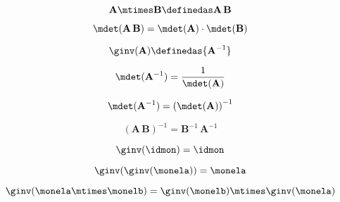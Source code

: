 \begin{equation} \label{eq:group-fullrank-composition}
   \mathbf{A} \mtimes \mathbf{B}  \definedas \mathbf{A}\,\mathbf{B}
\end{equation}


\begin{equation} \label{eq:group-fullrank-composition-det}
   \mdet(\mathbf{A} \, \mathbf{B}) = \mdet(\mathbf{A}) \cdot  \mdet(\mathbf{B})
\end{equation}

\begin{equation} \label{eq:group-fullrank-inverse}
   \ginv(\mathbf{A}) \definedas {\mathbf{A}^{-1}}
\end{equation}


\begin{equation} \label{eq:group-fullrank-inverse-det}
   \mdet(\mathbf{A}^{-1}) = \frac{1}{\mdet(\mathbf{A})}
\end{equation}

\begin{equation} \label{eq:group-fullrank-inverse-det2}
   \mdet(\mathbf{A}^{-1}) = \left( \mdet(\mathbf{A}) \right) ^ {-1}
\end{equation}

\begin{equation} \label{eq:group-fullrank-inverse-comp}
   (\mathbf{A}\,\mathbf{B})^{-1} = {\mathbf{B}^{-1} \, \mathbf{A}^{-1}}
\end{equation}


\begin{equation}\label{eq:group-neutral-invariant}
        \ginv(\idmon) = \idmon
      \end{equation}


\begin{equation}\label{eq:group-inverse-inverse}
        \ginv(\ginv(\monela)) = \monela
      \end{equation}


\begin{equation}\label{eq:group-inverse-of-composition}
    \ginv(\monela \mtimes \monelb ) = \ginv(\monelb) \mtimes \ginv(\monela)
\end{equation}

